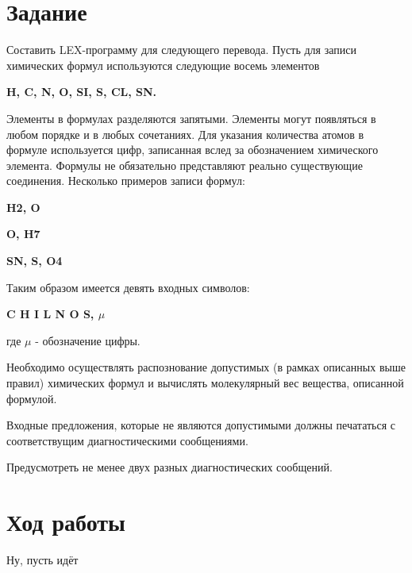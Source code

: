 





\section{Задание}
    Составить LEX-программу для следующего перевода.
    Пусть для записи химических формул используются следующие восемь элементов
    
    \textbf{H, C, N, O, SI, S, CL, SN.}

    Элементы в формулах разделяются запятыми.
    Элементы могут появляться в любом порядке и в любых сочетаниях.
    Для указания количества атомов в формуле используется цифр,
    записанная вслед за обозначением химического элемента.
    Формулы не обязательно представляют реально существующие соединения. 
    Несколько примеров записи формул:

    \textbf{H2, O}

    \textbf{O, H7}

    \textbf{SN, S, O4}

    Таким образом имеется девять входных символов:

    \textbf{C H I L N O S, $\mu$}

    где $\mu$ - обозначение цифры.

    Необходимо осуществлять распознование допустимых 
    (в рамках описанных выше правил) химических формул и
    вычислять молекулярный вес вещества, описанной формулой.
    
    Входные предложения, которые не являются допустимыми должны печататься
    с соответствущим диагностическими сообщениями.

    Предусмотреть не менее двух разных диагностических сообщений.


\section{Ход работы}

    Ну, пусть идёт


